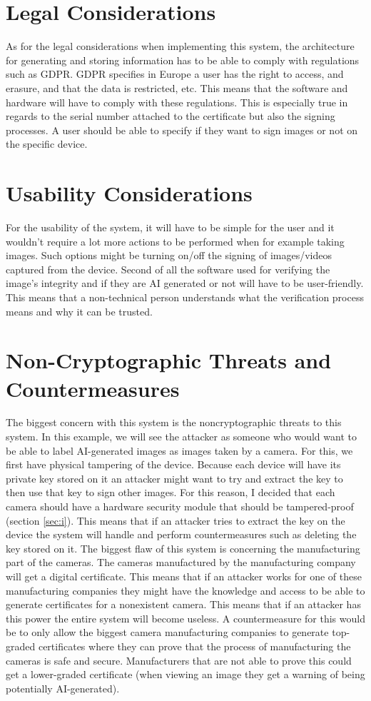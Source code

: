 \documentclass[9pt]{extarticle}
\begin{document}
\section{Legal Considerations}
As for the legal considerations when implementing this system, the architecture for generating and storing information has to be able to comply with regulations such as GDPR. GDPR specifies in Europe a user has the right to access, and erasure, and that the data is restricted, etc. This means that the software and hardware will have to comply with these regulations. This is especially true in regards to the serial number attached to the certificate but also the signing processes. A user should be able to specify if they want to sign images or not on the specific device.

\section{Usability Considerations}
For the usability of the system, it will have to be simple for the user and it wouldn't require a lot more actions to be performed when for example taking images. Such options might be turning on/off the signing of images/videos captured from the device. Second of all the software used for verifying the image's integrity and if they are AI generated or not will have to be user-friendly. This means that a non-technical person understands what the verification process means and why it can be trusted.

\section{Non-Cryptographic Threats and Countermeasures}
The biggest concern with this system is the noncryptographic threats to this system. In this example, we will see the attacker as someone who would want to be able to label AI-generated images as images taken by a camera. For this, we first have physical tampering of the device. Because each device will have its private key stored on it an attacker might want to try and extract the key to then use that key to sign other images. For this reason, I decided that each camera should have a hardware security module that should be tampered-proof (section \ref{sec:i}). This means that if an attacker tries to extract the key on the device the system will handle and perform countermeasures such as deleting the key stored on it. The biggest flaw of this system is concerning the manufacturing part of the cameras. The cameras manufactured by the manufacturing company will get a digital certificate. This means that if an attacker works for one of these manufacturing companies they might have the knowledge and access to be able to generate certificates for a nonexistent camera. This means that if an attacker has this power the entire system will become useless. A countermeasure for this would be to only allow the biggest camera manufacturing companies to generate top-graded certificates where they can prove that the process of manufacturing the cameras is safe and secure. Manufacturers that are not able to prove this could get a lower-graded certificate (when viewing an image they get a warning of being potentially AI-generated). 
\end{document}
